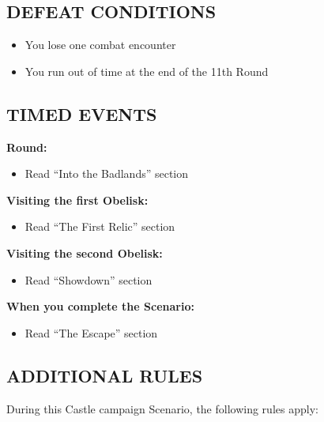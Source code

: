 \begin{multicols}{2}
\subsection*{\MakeUppercase{Defeat Conditions}}
\begin{itemize}
  \item You lose one combat encounter
  \item You run out of time at the end of the 11th Round
\end{itemize}

\subsection*{\MakeUppercase{Timed Events}}

\textbf{ Round:}
\begin{itemize}
  \item Read ``Into the Badlands'' section
\end{itemize}

\textbf{Visiting the first Obelisk:}
\begin{itemize}
  \item Read ``The First Relic'' section
\end{itemize}

\textbf{Visiting the second Obelisk:}
\begin{itemize}
  \item Read ``Showdown'' section
\end{itemize}

\textbf{When you complete the Scenario:}
\begin{itemize}
  \item Read ``The Escape'' section
\end{itemize}

\subsection*{\MakeUppercase{Additional rules}}

During this Castle campaign Scenario, the following rules apply:


\end{multicols}
